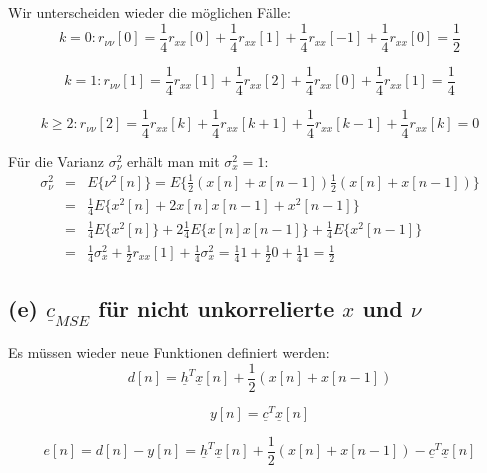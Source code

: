 Wir unterscheiden wieder die möglichen Fälle:
\begin{equation}
 k=0: r_{\nu \nu}[0] = \frac{1}{4} r_{xx}[0] + \frac{1}{4} r_{xx}[1] + \frac{1}{4} r_{xx}[-1] + \frac{1}{4} r_{xx}[0] = \frac{1}{2}
\end{equation}

\begin{equation}
 k=1: r_{\nu \nu}[1] = \frac{1}{4} r_{xx}[1] + \frac{1}{4} r_{xx}[2] + \frac{1}{4} r_{xx}[0] + \frac{1}{4} r_{xx}[1] = \frac{1}{4}
\end{equation}

\begin{equation}
 k \geq 2: r_{\nu \nu}[2] = \frac{1}{4} r_{xx}[k] + \frac{1}{4} r_{xx}[k+1] + \frac{1}{4} r_{xx}[k-1] + \frac{1}{4} r_{xx}[k] = 0
\end{equation}

Für die Varianz $\sigma_\nu^2$ erhält man mit $\sigma_x^2 = 1$:
\begin{eqnarray}
 \sigma_\nu^2 & = & E\{\nu^2[n]\} = E\{\frac{1}{2} (x[n] + x[n-1]) \frac{1}{2} (x[n] + x[n-1])\} \\
 & = & \frac{1}{4} E\{x^2[n] + 2 x[n]x[n-1] + x^2[n-1]\} \\
 & = & \frac{1}{4} E\{x^2[n]\} + 2 \frac{1}{4} E\{x[n]x[n-1]\} + \frac{1}{4} E\{x^2[n-1]\} \\
 & = & \frac{1}{4} \sigma_x^2 + \frac{1}{2} r_{xx}[1] + \frac{1}{4} \sigma_x^2 = \frac{1}{4} 1 + \frac{1}{2} 0 + \frac{1}{4} 1 = \frac{1}{2}
\end{eqnarray}


\subsection{(e) $\underline{c}_{MSE}$ für nicht unkorrelierte $x$ und $\nu$}

Es müssen wieder neue Funktionen definiert werden:
\begin{equation}
  d[n] = \underline{h}^T \underline{x}[n] + \frac{1}{2} (x[n] + x[n-1])
\end{equation}

\begin{equation}
  y[n] = \underline{c}^T \underline{x}[n]
\end{equation}

\begin{equation}
 e[n] = d[n] - y[n] = \underline{h}^T \underline{x}[n] + \frac{1}{2} (x[n] + x[n-1]) - \underline{c}^T \underline{x}[n]
\end{equation}

